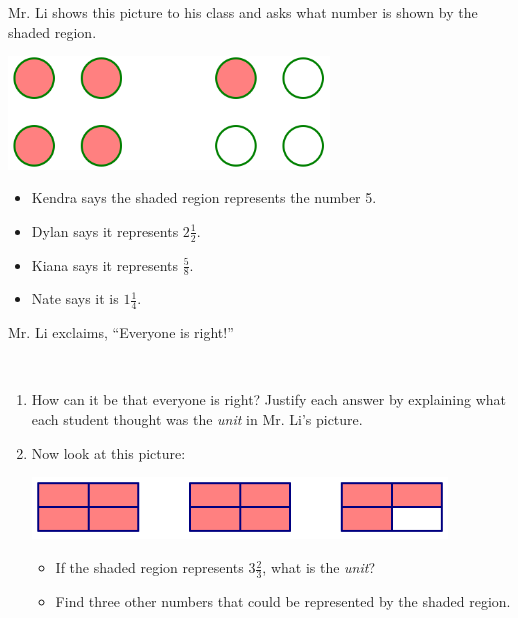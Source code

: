 \begin{example}
Mr. Li shows this picture to his class and asks what number is shown by the shaded region.

\begin{center}
\includegraphics[height = 3cm]{unit1}
\end{center}
\begin{itemize}
\item
Kendra says the shaded region represents the number 5.
\item
Dylan says it represents $2\frac 1 2$.
\item
Kiana says it represents $\frac 5 8$.
\item
Nate says it is $1 \frac 1 4$.
\end{itemize}

Mr. Li exclaims, ``Everyone is right!''

\end{example}

\begin{thinkpair*}\ 
\begin{enumerate}
\item
How can it be that everyone is right?  Justify each answer by explaining what each student thought was the \emph{unit} in Mr. Li's picture.\\

\item
Now look at this picture:
\begin{center}
\includegraphics[width = 11cm]{unit2}
\end{center}

\begin{itemize}
\item
If the shaded region represents $3\frac 2 3$, what is the \emph{unit}?
\item
Find three other numbers that could be represented by the shaded region.
\end{itemize}
\end{enumerate}

\end{thinkpair*}



